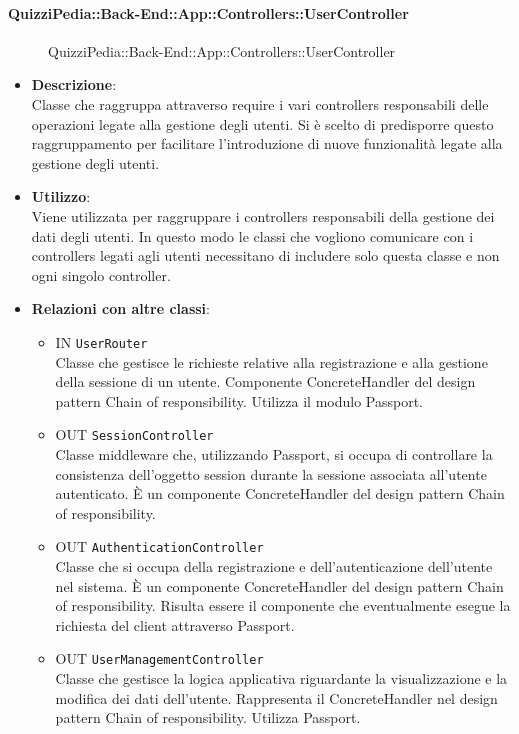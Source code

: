 \paragraph{QuizziPedia::Back-End::App::Controllers::UserController}
\label{QuizziPedia::Back-End::App::Controllers::UserController}
\begin{figure}
	\centering
	\caption{QuizziPedia::Back-End::App::Controllers::UserController}
\end{figure}
\FloatBarrier
\begin{itemize}
	\item 
	\textbf{Descrizione}:\\
	Classe che raggruppa attraverso require i vari controllers responsabili delle operazioni legate alla gestione degli utenti. Si è scelto di predisporre questo raggruppamento per facilitare l'introduzione di nuove funzionalità legate alla gestione degli utenti.
	\item \textbf{Utilizzo}:\\
	Viene utilizzata per raggruppare i controllers responsabili della gestione dei dati degli utenti. In questo modo le classi che vogliono comunicare con i controllers legati agli utenti necessitano di includere solo questa classe e non ogni singolo controller.
	\item \textbf{Relazioni con altre classi}:\\
	\begin{itemize}
		\item 
			IN	\texttt{UserRouter}\\
			Classe che gestisce le richieste relative alla registrazione e alla gestione della sessione di un utente. Componente ConcreteHandler del design pattern Chain of responsibility. Utilizza il modulo Passport.		
		\item 
			OUT \texttt{SessionController}\\
			Classe middleware che, utilizzando Passport, si occupa di controllare la consistenza dell'oggetto session durante la sessione associata all'utente autenticato. È un componente ConcreteHandler del design pattern Chain of responsibility.
		\item 
			OUT \texttt{AuthenticationController}\\
			Classe che si occupa della registrazione e dell'autenticazione dell'utente nel sistema. È un componente ConcreteHandler del design pattern Chain of responsibility. Risulta essere il componente che eventualmente esegue la richiesta del client attraverso Passport.	
		\item 
			OUT \texttt{UserManagementController}\\
			Classe che gestisce la logica applicativa riguardante la visualizzazione e la modifica dei dati dell'utente.
			Rappresenta il ConcreteHandler nel design pattern Chain of responsibility. Utilizza Passport.
	\end{itemize}
\end{itemize}
